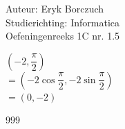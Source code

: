 \documentclass[a4paper]{article}
\begin{document}
  
\noindent \large Auteur: Eryk Borczuch \\
\noindent \large Studierichting: Informatica\\
\noindent \large Oefeningenreeks 1C nr. 1.5\\

\medskip

\normalsize

$\left(-2, \dfrac{\pi}{2}\right)$\\

$=\left(-2 \cos{\dfrac{\pi}{2}}, -2 \sin{\dfrac{\pi}{2}}\right)$\\

$=(0,-2)$  




\begin{thebibliography}{999}
\end{thebibliography}
\end{document}
